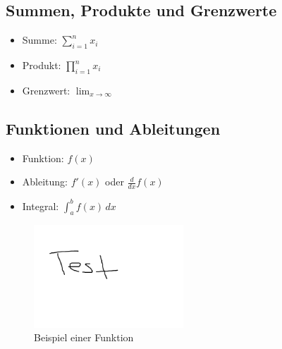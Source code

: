\documentclass[a4paper,10pt]{article}
\begin{document}
\subsection{Summen, Produkte und Grenzwerte}
\begin{itemize}
    \item Summe: $\sum_{i=1}^{n} x_i$
    \item Produkt: $\prod_{i=1}^{n} x_i$
    \item Grenzwert: $\lim_{x \to \infty}$
\end{itemize}
\subsection{Funktionen und Ableitungen}
\begin{itemize}
    \item Funktion: $f(x)$
    \item Ableitung: $f'(x)$ oder $\frac{d}{dx} f(x)$
    \item Integral: $\int_{a}^{b} f(x) \,dx$
\end{itemize}

\begin{figure}[h]
    \centering
    \includegraphics[width=0.5\textwidth]{img/test.png} %
    \caption{Beispiel einer Funktion}
    \label{fig:fkt}
\end{figure}

\vfill
{}
\end{document}
